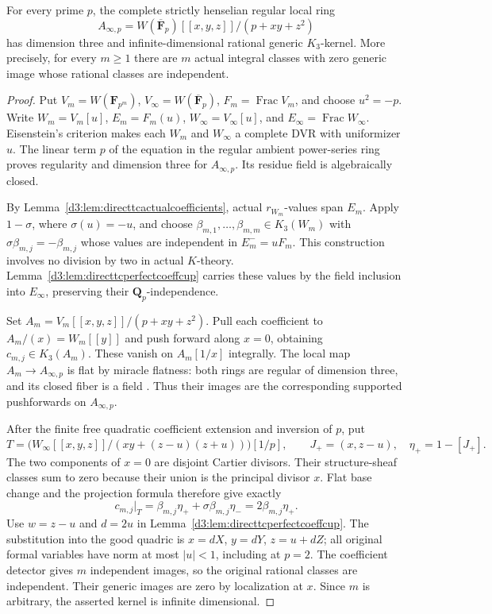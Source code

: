\begin{theorem}\label{d3:thm:directtcstrictinfiniteallp}
For every prime $p$, the complete strictly henselian regular local ring
\[
 A_{\infty,p}=W(\overline{\mathbf F}_p)[[x,y,z]]/(p+xy+z^2)
\]
has dimension three and infinite-dimensional rational generic
$K_3$-kernel. More precisely, for every $m\ge1$ there are $m$ actual
integral classes with zero generic image whose rational classes are
independent.
\end{theorem}
\begin{proof}
Put $V_m=W(\mathbf F_{p^m})$, $V_\infty=W(\overline{\mathbf F}_p)$,
$F_m=\operatorname{Frac}V_m$, and choose $u^2=-p$. Write
$W_m=V_m[u]$, $E_m=F_m(u)$, $W_\infty=V_\infty[u]$, and
$E_\infty=\operatorname{Frac}W_\infty$. Eisenstein's criterion makes
each $W_m$ and $W_\infty$ a complete DVR with uniformizer $u$.
The linear term $p$ of the equation in the regular ambient
power-series ring proves regularity and dimension three for
$A_{\infty,p}$. Its residue field is algebraically closed.

By Lemma~\ref{d3:lem:directtcactualcoefficients}, actual $r_{W_m}$-values
span $E_m$. Apply $1-\sigma$, where $\sigma(u)=-u$, and choose
$\beta_{m,1},\ldots,\beta_{m,m}\in K_3(W_m)$ with
$\sigma\beta_{m,j}=-\beta_{m,j}$ whose values are independent in
$E_m^-=uF_m$. This construction involves no division by two in
actual $K$-theory. Lemma~\ref{d3:lem:directtcperfectcoeffcup} carries
these values by the field inclusion into $E_\infty$, preserving
their $\mathbf Q_p$-independence.

Set $A_m=V_m[[x,y,z]]/(p+xy+z^2)$. Pull each coefficient to
$A_m/(x)=W_m[[y]]$ and push forward along $x=0$, obtaining
$c_{m,j}\in K_3(A_m)$. These vanish on $A_m[1/x]$ integrally.
The local map $A_m\to A_{\infty,p}$ is flat by miracle flatness:
both rings are regular of dimension three, and its closed fiber
is a field \cite[Tag~00R4]{StacksFlatness}. Thus their images
are the corresponding supported pushforwards on $A_{\infty,p}$.

After the finite free quadratic coefficient extension and inversion
of $p$, put
\[
 T=\bigl(W_\infty[[x,y,z]]/(xy+(z-u)(z+u))\bigr)[1/p],
 \qquad J_+=(x,z-u),\quad\eta_+=1-[J_+].
\]
The two components of $x=0$ are disjoint Cartier divisors. Their
structure-sheaf classes sum to zero because their union is the
principal divisor $x$. Flat base change and the projection formula
therefore give exactly
\[
 c_{m,j}|_T=\beta_{m,j}\eta_+
          +\sigma\beta_{m,j}\eta_-
          =2\beta_{m,j}\eta_+.
\]
Use $w=z-u$ and $d=2u$ in
Lemma~\ref{d3:lem:directtcperfectcoeffcup}. The substitution into the
good quadric is
$x=dX$, $y=dY$, $z=u+dZ$; all original formal variables have norm
at most $|u|<1$, including at $p=2$. The coefficient detector gives
$m$ independent images, so the original rational classes are
independent. Their generic images are zero by localization at $x$.
Since $m$ is arbitrary, the asserted kernel is infinite dimensional.
\end{proof}

